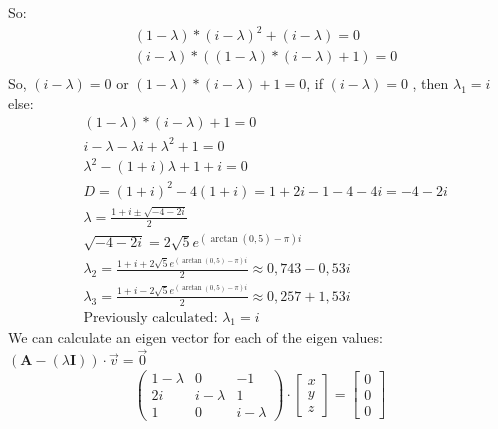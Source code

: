 \documentclass{article}
\begin{document}
            So:
            \begin{align*}
                &(1 - \lambda) * (i - \lambda)^2 + (i - \lambda) = 0 \\
                &(i - \lambda) * ((1 - \lambda) * (i - \lambda) + 1) = 0 \\
            \end{align*}
            So, $(i - \lambda) = 0$ or $(1 - \lambda) * (i - \lambda) + 1 = 0$,
            if $(i - \lambda) = 0$ , then $\lambda_1 = i$ else: \\
            \begin{align*}
                &(1 - \lambda) * (i - \lambda) + 1 = 0 \\
                &i - \lambda - \lambda i + \lambda^2 + 1 = 0 \\
                &\lambda^2 - (1 + i)\lambda + 1 + i = 0 \\
                &D = (1 + i)^2 - 4(1 + i) = 1 + 2i - 1 - 4 - 4i = -4 - 2i \\
                &\lambda = \frac{1 + i \pm \sqrt{-4 -2i}}{2} \\
                &\sqrt{-4 -2i} = 2\sqrt{5}e^{(\arctan(0,5)-\pi)i} \\
                &\lambda_2 = \frac{1 + i + 2\sqrt{5}e^{(\arctan(0,5)-\pi)i}}{2} \approx 0,743 - 0,53i \\
                &\lambda_3 = \frac{1 + i - 2\sqrt{5}e^{(\arctan(0,5)-\pi)i}}{2} \approx 0,257 + 1,53i\\
                &\text{Previously calculated: }\lambda_1=i
            \end{align*}
            We can calculate an eigen vector for each of the eigen values: $(\mathbf{A} - (\lambda\mathbf{I})) \cdot \vec{v} = \vec{0}$
            \[
                \begin{pmatrix}1 - \lambda  & 0 & -1 \\2i  & i - \lambda   & 1 \\ 1 & 0 & i - \lambda \end{pmatrix} \cdot 
                \begin{bmatrix}
                x \\
                y \\
                z
                \end{bmatrix}
                =
                \begin{bmatrix}
                    0 \\
                    0 \\
                    0
                \end{bmatrix}
            \]
\end{document}
